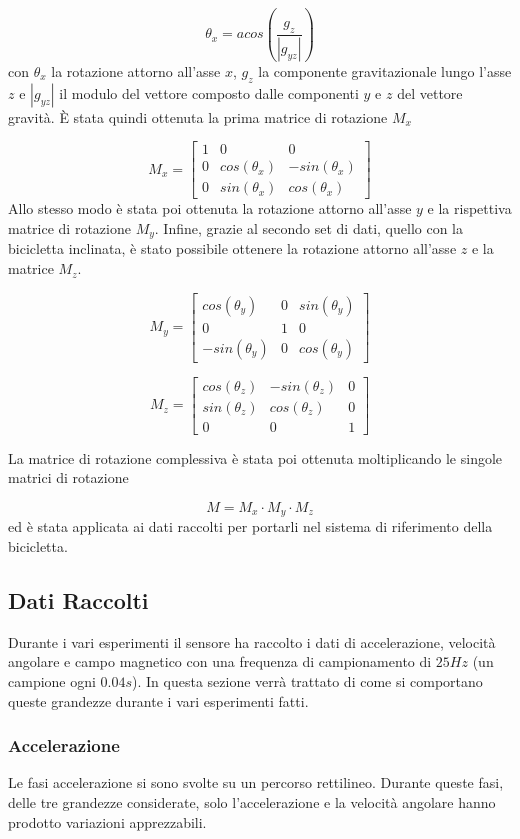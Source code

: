 \documentclass[12pt]{article}
\begin{document}
	\[\theta_{x}=acos\left(\frac{g_{z}}{|g_{yz}|}\right)\]
	con \(\theta_{x}\) la rotazione attorno all'asse \(x\), \(g_{z}\) la componente gravitazionale lungo l'asse \(z\) e \(|g_{yz}|\) il modulo del vettore composto dalle componenti \(y\) e \(z\) del vettore gravità. È stata quindi ottenuta la prima matrice di rotazione \(M_{x}\)
	
	\[M_{x}= \begin{bmatrix}
		1 & 0 & 0 \\
		0 & cos(\theta_{x}) & -sin(\theta_{x}) \\
		0 & sin(\theta_{x}) & cos(\theta_{x})
	\end{bmatrix}\]
	Allo stesso modo è stata poi ottenuta la rotazione attorno all'asse \(y\) e la rispettiva matrice di rotazione \(M_{y}\). Infine, grazie al secondo set di dati, quello con la bicicletta inclinata, è stato possibile ottenere la rotazione attorno all'asse \(z\) e la matrice \(M_{z}\).
	
	\[M_{y}=\begin{bmatrix}
		cos(\theta_{y}) & 0 & sin(\theta_{y}) \\
		0 & 1 & 0 \\
		-sin(\theta_{y}) & 0 & cos(\theta_{y})
	\end{bmatrix}\]
	
	\[M_{z}=\begin{bmatrix}
		cos(\theta_{z}) & -sin(\theta_{z}) & 0 \\
		sin(\theta_{z}) & cos(\theta_{z}) & 0 \\
		0 & 0 & 1
	\end{bmatrix}\]
	
	La matrice di rotazione complessiva è stata poi ottenuta moltiplicando le singole matrici di rotazione 
	
	\[M=M_{x}\cdot M_{y}\cdot M_{z}\]
	ed è stata applicata ai dati raccolti per portarli nel sistema di riferimento della bicicletta.
	
	\subsection{Dati Raccolti}
	Durante i vari esperimenti il sensore ha raccolto i dati di accelerazione, velocità angolare e campo magnetico con una frequenza di campionamento di \(25Hz\) (un campione ogni \(0.04s\)). In questa sezione verrà trattato di come si comportano queste grandezze durante i vari esperimenti fatti.
	
	\subsubsection{Accelerazione}
	Le fasi accelerazione si sono svolte su un percorso rettilineo. Durante queste fasi, delle tre grandezze considerate, solo l'accelerazione e la velocità angolare hanno prodotto variazioni apprezzabili.
	
\end{document}
